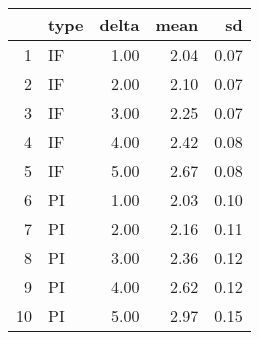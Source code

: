 \begin{table}[ht]
\centering
\begin{tabular}{rlrrr}
  \hline
 & type & delta & mean & sd \\ 
  \hline
1 & IF & 1.00 & 2.04 & 0.07 \\ 
  2 & IF & 2.00 & 2.10 & 0.07 \\ 
  3 & IF & 3.00 & 2.25 & 0.07 \\ 
  4 & IF & 4.00 & 2.42 & 0.08 \\ 
  5 & IF & 5.00 & 2.67 & 0.08 \\ 
  6 & PI & 1.00 & 2.03 & 0.10 \\ 
  7 & PI & 2.00 & 2.16 & 0.11 \\ 
  8 & PI & 3.00 & 2.36 & 0.12 \\ 
  9 & PI & 4.00 & 2.62 & 0.12 \\ 
  10 & PI & 5.00 & 2.97 & 0.15 \\ 
   \hline
\end{tabular}
\end{table}
